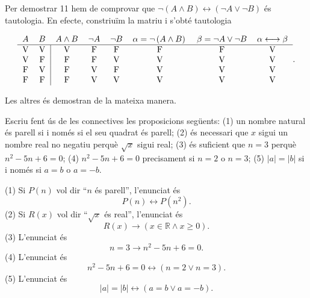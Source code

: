 Per demostrar 11 hem de comprovar que $\lnot(A\wedge B)\longleftrightarrow
\left( \lnot A\vee\lnot B\right) $ és tautologia. En efecte, constriuïm la matriu i s'obté tautologia

\begin{equation*}
\begin{tabular}{llllllll}
$A$ & $B$ & $A\wedge B$ & $\lnot A$ & $\lnot B$ & $\alpha=\lnot\left(
A\wedge B\right) \,$ & $\beta=\lnot A\vee\lnot B$ & $\alpha\longleftrightarrow\beta $ \\ \hline
\multicolumn{1}{c}{V} & \multicolumn{1}{c|}{V} & \multicolumn{1}{c}{V} &
\multicolumn{1}{c}{F} & \multicolumn{1}{c}{F} & \multicolumn{1}{c}{F} &
\multicolumn{1}{c}{F} & \multicolumn{1}{c}{V} \\
\multicolumn{1}{c}{V} & \multicolumn{1}{c|}{F} & \multicolumn{1}{c}{F} &
\multicolumn{1}{c}{F} & \multicolumn{1}{c}{V} & \multicolumn{1}{c}{V} &
\multicolumn{1}{c}{V} & \multicolumn{1}{c}{V} \\
\multicolumn{1}{c}{F} & \multicolumn{1}{c|}{V} & \multicolumn{1}{c}{F} &
\multicolumn{1}{c}{V} & \multicolumn{1}{c}{F} & \multicolumn{1}{c}{V} &
\multicolumn{1}{c}{V} & \multicolumn{1}{c}{V} \\
\multicolumn{1}{c}{F} & \multicolumn{1}{c|}{F} & \multicolumn{1}{c}{F} &
\multicolumn{1}{c}{V} & \multicolumn{1}{c}{V} & \multicolumn{1}{c}{V} &
\multicolumn{1}{c}{V} & \multicolumn{1}{c}{V}\end{tabular}
.
\end{equation*}

Les altres és demostran de la mateixa manera.

\begin{exemple}
Escriu fent ús de les connectives les proposicions següents: (1) un nombre
natural és parell si i només si el seu quadrat és parell; (2) és necessari
que $x$ sigui un nombre real no negatiu perquè $\sqrt{x}$ sigui real; (3) és
suficient que $n=3$ perquè $n^{2}-5n+6=0$; (4) $n^{2}-5n+6=0$ precisament si
$n=2$ o $n=3$; (5) $\left\vert a\right\vert=\left\vert b\right\vert$ si i
només si $a=b$ o $a=-b$.
\end{exemple}

\begin{solucio}
(1) Si $P(n)$ vol dir \enquote{$n$ és parell}, l'enunciat és
\[
P(n)\longleftrightarrow P(n^{2}).
\]
(2) Si $R(x)$ vol dir \enquote{$\sqrt{x}$ és real}, l'enunciat és
\[
R(x)\longrightarrow (x\in\mathbb{R}\wedge x\geq0).
\]
(3) L'enunciat és
\[
n=3\longrightarrow n^{2}-5n+6=0.
\]
(4) L'enunciat és
\[
n^{2}-5n+6=0\longleftrightarrow(n=2\vee n=3).
\]
(5) L'enunciat és
\[
\left\vert a\right\vert=\left\vert b\right\vert\longleftrightarrow(a=b\vee a=-b).
\]
\end{solucio}

